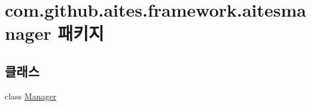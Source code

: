 \hypertarget{namespacecom_1_1github_1_1aites_1_1framework_1_1aitesmanager}{}\section{com.\+github.\+aites.\+framework.\+aitesmanager 패키지}
\label{namespacecom_1_1github_1_1aites_1_1framework_1_1aitesmanager}
\subsection*{클래스}
\begin{DoxyCompactItemize}
\item 
class \mbox{\hyperlink{classcom_1_1github_1_1aites_1_1framework_1_1aitesmanager_1_1_manager}{Manager}}
\end{DoxyCompactItemize}

